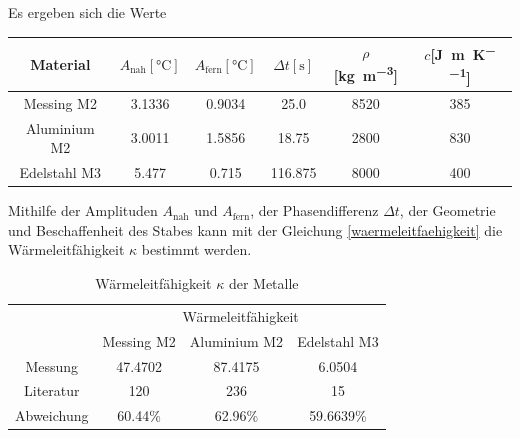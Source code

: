 \newpage
\noindent Es ergeben sich die Werte
\begin{table}[htbp]
	\centering
	\begin{tabular}{c S[table-format=1.5] S[table-format=1.5] S[table-format=3.3] c c}
		\toprule
		{Material}&{$A_\text{nah} [\si{\degreeCelsius}]$}&{$A_\text{fern}[\si{\degreeCelsius}]$}&{$\Delta{t}[\si{\second}]$}&{$\rho$[\si{\kilo\gram\per\meter\cubed}]}&{$c$[\si{\joule\per\meter\per\kelvin}]}\\
		\midrule
		{Messing M2}& 	{3.1336}&{0.9034}&	{25.0}&		{8520}&{385}\\
		{Aluminium M2}&	{3.0011}&{1.5856}&	{18.75}&	{2800}&{830}\\
		{Edelstahl M3}&	{5.477}&{0.715}&	{116.875}&	{8000}&{400}\\
		\bottomrule
	\end{tabular}
\end{table}
Mithilfe der Amplituden $A_{\text{nah}}$ und $A_{\text{fern}}$, der Phasendifferenz $\Delta t$, der Geometrie und Beschaffenheit des Stabes kann mit der Gleichung \eqref{waermeleitfaehigkeit} die Wärmeleitfähigkeit $\kappa$ bestimmt werden.
\begin{table}[htbp]
	\centering
	\begin{tabular}{cccc}
	\toprule
	&\multicolumn{3}{c}{Wärmeleitfähigkeit \kappa [\si{\watt\per\meter\per\kelvin}]}\\
	&{Messing M2}&{Aluminium M2}&{Edelstahl M3}\\
	\midrule
	{Messung}&{47.4702}& 87.4175&6.0504\\
	{Literatur}&{120}&{236}&15\\
	\midrule
	{Abweichung}&60.44\%&62.96\%&59.6639\%\\
	\bottomrule
	\end{tabular}
	\label{tab:waermeleitfaehigkeitwerte}
	\caption{Wärmeleitfähigkeit $\kappa$ der Metalle}
\end{table}
